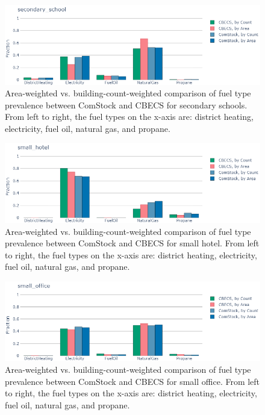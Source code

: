 \begin{figure}
  \centering
  \includegraphics[scale=0.5]{figures/cbecs_comstock_fuel_comparison_secondary_school.png}
  \caption[Comparison of fuel type prevalence between ComStock and CBECS for secondary schools]{Area-weighted vs. building-count-weighted comparison of fuel type prevalence between ComStock and CBECS for secondary schools. From left to right, the fuel types on the x-axis are: district heating, electricity, fuel oil, natural gas, and propane.}
  \label{fig:cbecs_comstock_fuel_comparison_secondary_school}
\end{figure}

\begin{figure}
  \centering
  \includegraphics[scale=0.5]{figures/cbecs_comstock_fuel_comparison_small_hotel.png}
  \caption[Comparison of fuel type prevalence between ComStock and CBECS for small hotel]{Area-weighted vs. building-count-weighted comparison of fuel type prevalence between ComStock and CBECS for small hotel. From left to right, the fuel types on the x-axis are: district heating, electricity, fuel oil, natural gas, and propane.}
  \label{fig:cbecs_comstock_fuel_comparison_small_hotel}
\end{figure}

\begin{figure}
  \centering
  \includegraphics[scale=0.5]{figures/cbecs_comstock_fuel_comparison_small_office.png}
  \caption[Comparison of fuel type prevalence between ComStock and CBECS for small office]{Area-weighted vs. building-count-weighted comparison of fuel type prevalence between ComStock and CBECS for small office. From left to right, the fuel types on the x-axis are: district heating, electricity, fuel oil, natural gas, and propane.}
  \label{fig:cbecs_comstock_fuel_comparison_small_office}
\end{figure}

